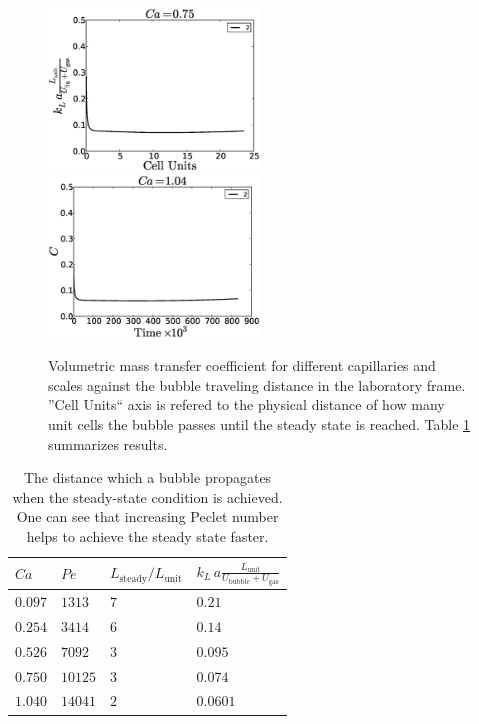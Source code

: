 \documentclass{article}
\newcommand{\vol}{k_L\,a}
\newcommand{\lunit}{L_{\mathrm{unit}}}
\newcommand{\ububble}{U_{\mathrm{bubble}}}
\newcommand{\ugas}{U_{\mathrm{gas}}}
\newcommand{\volnondim}{\vol \frac{\lunit}{\ububble+\ugas}}
\begin{document}
\begin{figure}[htb!]
\includegraphics[width=0.5\textwidth]{Figures/aver_conc_scale_ca05.eps}\\
\includegraphics[width=0.5\textwidth]{Figures/aver_conc_scale_ca14.eps}
\caption{Volumetric mass transfer coefficient for different capillaries and scales against the
bubble traveling distance in the laboratory frame. ''Cell Units`` axis is refered to the physical
distance of how many unit cells the bubble passes until the steady state is reached. Table
\ref{table:steady:state:average}
summarizes results.\label{fig:aver:conc:different:capillaries}}
\end{figure}
\begin{table}[htb!]
\begin{tabularx}{\textwidth}{|X|X|X|X|}
\hline
$Ca$    &$Pe$     &$L_{\mathrm{steady}}/\lunit$& $\volnondim$ \\
\hline
$0.097$ &$1313$  &$7$&$0.21$  \\ 
$0.254$ &$3414$  &$6$&$0.14$  \\ 
$0.526$ &$7092$  &$3$&$0.095$ \\
$0.750$ &$10125$ &$3$&$0.074$ \\
$1.040$ &$14041$ &$2$&$0.0601$\\
\hline
\end{tabularx}
\caption{The distance which a bubble propagates when the
steady-state condition is achieved. One can see that increasing
Peclet number helps to achieve the steady state faster.\label{table:steady:state:average}}
\end{table}
\end{document}
